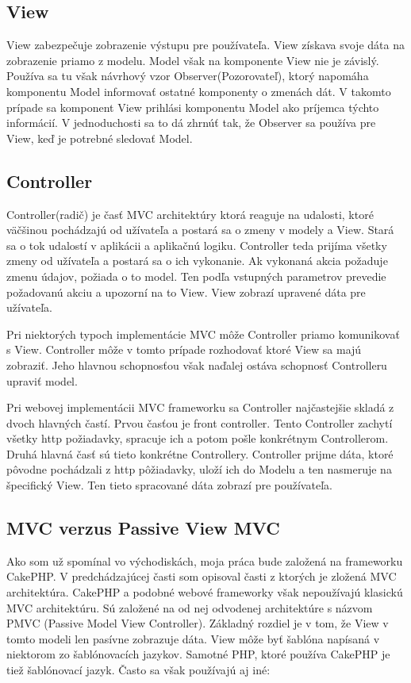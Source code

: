 \documentclass[12pt,onesided]{book}
\begin{document}
\subsection{View}
View zabezpečuje zobrazenie výstupu pre používateľa. View získava svoje dáta na zobrazenie priamo z modelu. Model však na komponente View nie je závislý. Používa sa tu však návrhový vzor Observer(Pozorovateľ), ktorý napomáha komponentu Model  informovať ostatné komponenty o zmenách dát. V takomto prípade sa komponent View prihlási komponentu Model ako príjemca týchto informácií. V jednoduchosti sa to dá zhrnúť tak, že Observer sa používa pre View, keď je potrebné sledovať Model.



\subsection{Controller}
Controller(radič) je časť MVC architektúry ktorá reaguje na udalosti, ktoré väčšinou pochádzajú od užívateľa a postará sa o zmeny v modely a View.  Stará sa o tok udalostí v aplikácii a aplikačnú logiku. Controller teda prijíma všetky zmeny od užívateľa a postará sa o ich vykonanie. Ak vykonaná akcia požaduje zmenu údajov, požiada o to model. Ten podľa vstupných parametrov prevedie požadovanú akciu a upozorní na to View. View zobrazí upravené dáta pre užívateľa.

Pri niektorých typoch implementácie MVC môže Controller priamo komunikovať s View. Controller môže v tomto prípade rozhodovať ktoré View sa majú zobraziť. Jeho hlavnou schopnosťou však naďalej ostáva schopnosť Controlleru upraviť model.

Pri webovej implementácii MVC frameworku sa Controller najčastejšie skladá z dvoch hlavných častí. Prvou časťou je front controller. Tento Controller zachytí všetky http požiadavky, spracuje ich a potom pošle konkrétnym Controllerom. Druhá hlavná časť sú tieto konkrétne Controllery. Controller prijme dáta, ktoré pôvodne pochádzali z http pôžiadavky, uloží ich do Modelu a ten nasmeruje na špecifický View. Ten tieto spracované dáta zobrazí pre používateľa.

\subsection{MVC verzus Passive View MVC}
Ako som už spomínal vo východiskách, moja práca bude založená na frameworku CakePHP. V predchádzajúcej časti som opisoval časti z ktorých je zložená MVC architektúra. CakePHP a podobné webové frameworky však nepoužívajú klasickú MVC architektúru. Sú založené na od nej odvodenej architektúre s názvom PMVC (Passive Model View Controller). Základný rozdiel je v tom, že View v tomto modeli len pasívne zobrazuje dáta. View môže byť šablóna napísaná v niektorom zo šablónovacích jazykov. Samotné PHP, ktoré používa CakePHP je tiež šablónovací jazyk. Často sa však používajú aj iné: 
\end{document}
